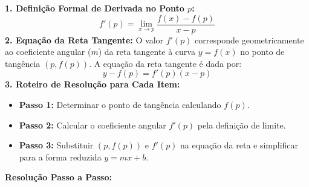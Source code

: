 \begin{recursosbox}[title=Estratégia Geral e Recursos Algébricos]
\textbf{1. Definição Formal de Derivada no Ponto $p$:}
\[
f'(p) = \lim_{x \to p} \frac{f(x) - f(p)}{x - p}
\]
\textbf{2. Equação da Reta Tangente:}
O valor $f'(p)$ corresponde geometricamente ao coeficiente angular ($m$) da reta tangente à curva $y = f(x)$ no ponto de tangência $(p, f(p))$. A equação da reta tangente é dada por:
\[
y - f(p) = f'(p)(x - p)
\]
\textbf{3. Roteiro de Resolução para Cada Item:}
\begin{itemize}[noitemsep, topsep=2pt]
    \item \textbf{Passo 1:} Determinar o ponto de tangência calculando $f(p)$.
    \item \textbf{Passo 2:} Calcular o coeficiente angular $f'(p)$ pela definição de limite.
    \item \textbf{Passo 3:} Substituir $(p, f(p))$ e $f'(p)$ na equação da reta e simplificar para a forma reduzida $y = mx + b$.
\end{itemize}
\end{recursosbox}

\vspace{0.4cm}
\textbf{Resolução Passo a Passo:}

